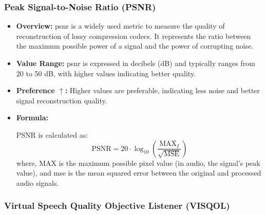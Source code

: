 \subsubsection{Peak Signal-to-Noise Ratio (PSNR)}
\begin{itemize}
    \item \textbf{Overview:} \gls{psnr} is a widely used metric to measure the quality of reconstruction of lossy compression codecs. It represents the ratio between the maximum possible power of a signal and the power of corrupting noise.
    
    \item \textbf{Value Range:} \gls{psnr} is expressed in decibels (dB) and typically ranges from 20 to 50 dB, with higher values indicating better quality.
    
    \item \textbf{Preference $\uparrow$:} Higher values are preferable, indicating less noise and better signal reconstruction quality.
    
    \item \textbf{Formula:}
    
    PSNR is calculated as:
    \begin{equation}
        \text{PSNR} = 20 \cdot \log_{10}\left(\frac{{\text{MAX}_I}}{\sqrt{\text{MSE}}}\right)
    \end{equation}
    where, \( \text{MAX} \) is the maximum possible pixel value (in audio, the signal's peak value), and \gls{mse} is the mean squared error between the original and processed audio signals.
\end{itemize}

\subsubsection{Virtual Speech Quality Objective Listener (VISQOL)}

